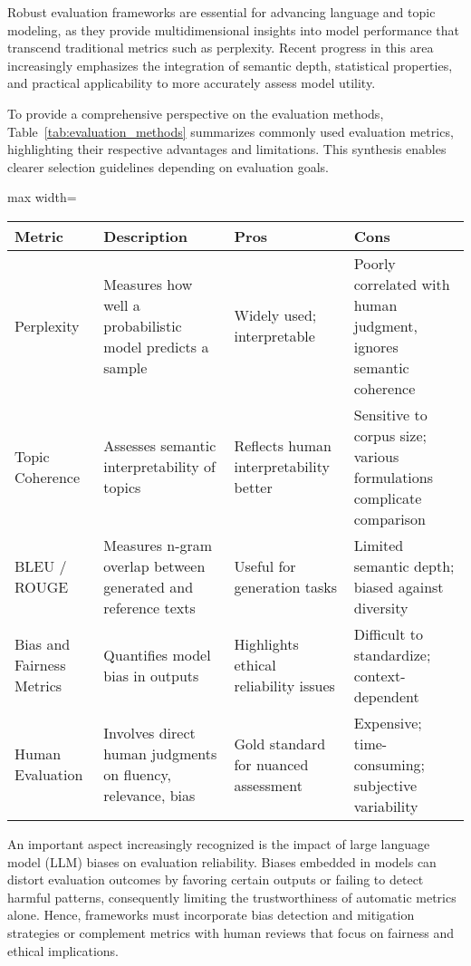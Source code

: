 \documentclass[sigconf]{acmart}
\begin{document}
Robust evaluation frameworks are essential for advancing language and topic modeling, as they provide multidimensional insights into model performance that transcend traditional metrics such as perplexity. Recent progress in this area increasingly emphasizes the integration of semantic depth, statistical properties, and practical applicability to more accurately assess model utility.

To provide a comprehensive perspective on the evaluation methods, Table~\ref{tab:evaluation_methods} summarizes commonly used evaluation metrics, highlighting their respective advantages and limitations. This synthesis enables clearer selection guidelines depending on evaluation goals.

\begin{table*}[htbp]
\centering
\caption{Comparison of Evaluation Metrics for Language and Topic Models}
\label{tab:evaluation_methods}
\begin{adjustbox}{max width=\textwidth}
\begin{tabular}{@{}llll@{}}
\toprule
Metric & Description & Pros & Cons \\
\midrule
Perplexity & Measures how well a probabilistic model predicts a sample & Widely used; interpretable & Poorly correlated with human judgment, ignores semantic coherence \\
Topic Coherence & Assesses semantic interpretability of topics & Reflects human interpretability better & Sensitive to corpus size; various formulations complicate comparison \\
BLEU / ROUGE & Measures n-gram overlap between generated and reference texts & Useful for generation tasks & Limited semantic depth; biased against diversity \\
Bias and Fairness Metrics & Quantifies model bias in outputs & Highlights ethical reliability issues & Difficult to standardize; context-dependent \\
Human Evaluation & Involves direct human judgments on fluency, relevance, bias & Gold standard for nuanced assessment & Expensive; time-consuming; subjective variability \\
\bottomrule
\end{tabular}
\end{adjustbox}
\end{table*}

An important aspect increasingly recognized is the impact of large language model (LLM) biases on evaluation reliability. Biases embedded in models can distort evaluation outcomes by favoring certain outputs or failing to detect harmful patterns, consequently limiting the trustworthiness of automatic metrics alone. Hence, frameworks must incorporate bias detection and mitigation strategies or complement metrics with human reviews that focus on fairness and ethical implications.
\end{document}
